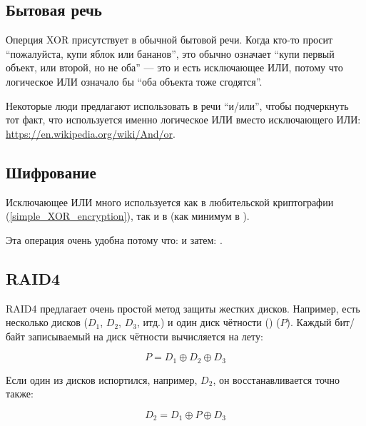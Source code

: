 ﻿
\label{XOR_property}



\subsection{Бытовая речь}

Оперция XOR присутствует в обычной бытовой речи.
Когда кто-то просит ``пожалуйста, купи яблок или бананов'',
это обычно означает ``купи первый объект, или второй, но не оба'' --- это и есть исключающее ИЛИ,
потому что логическое ИЛИ означало бы ``оба объекта тоже сгодятся''.

Некоторые люди предлагают использовать в речи ``и/или'', чтобы подчеркнуть тот факт, что используется именно логическое ИЛИ
вместо исключающего ИЛИ: \url{https://en.wikipedia.org/wiki/And/or}.

\subsection{Шифрование}

Исключающее ИЛИ много используется как в любительской криптографии (\ref{simple_XOR_encryption}), так и в 
(как минимум в ).

Эта операция очень удобна потому что:
 и затем:
.

\subsection{\ac{RAID}4}

\ac{RAID}4 предлагает очень простой метод защиты жестких дисков.
Например, есть несколько дисков ($D_1$, $D_2$, $D_3$, итд.) и один диск чётности () ($P$).
Каждый бит/байт записываемый на диск чётности вычисляется на лету:

\begin{equation} \label{eq:RAID4}
P = D_1 \oplus D_2 \oplus D_3
\end{equation}

Если один из дисков испортился, например, $D_2$, он восстанавливается точно также:

\begin{equation}
D_2 = D_1 \oplus P \oplus D_3
\end{equation}

